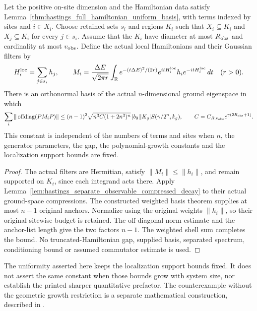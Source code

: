 \begin{lemma}
    \label{thm:hastings_actual_truncated_basis_polynomial_growth}
    \leanok
    Let the positive on-site dimension and the Hamiltonian data satisfy
    Lemma~\ref{thm:hastings_full_hamiltonian_uniform_basis}, with terms
    indexed by sites and $i\in X_i$. Choose retained sets $s_i$ and regions
    $K_i$ such that $X_i\subseteq K_i$ and $X_j\subseteq K_i$ for every
    $j\in s_i$. Assume that the $K_i$ have diameter at most $R_{\rm obs}$
    and cardinality at most $v_{\rm obs}$.
    Define the actual local Hamiltonians and their Gaussian filters by
    \[
      H_i^{\rm loc}=\sum_{j\in s_i}h_j,\qquad
      M_i=\frac{\Delta E}{\sqrt{2\pi r}}
       \int_{\mathbb R} e^{-(t\Delta E)^2/(2r)}
       e^{itH_i^{\rm loc}}h_i e^{-itH_i^{\rm loc}}\,dt
       \quad(r>0).
    \]
    There is an orthonormal basis of the actual $n$-dimensional ground
    eigenspace in which
    \[
      \sum_i\|\operatorname{offdiag}(PM_iP)\|
      \le (n-1)^2\sqrt{n^3 C(1+2n^3)^n}\,
          |b_0||K_g|S(\gamma/2^n,k_g),
      \qquad
      C=C_{R,v_{\rm obs}}e^{\gamma(2R_{\rm obs}+1)}.
    \]
    This constant is independent of the numbers of terms and sites when
    $n$, the generator parameters, the gap, the polynomial-growth constants
    and the localization support bounds are fixed.
\end{lemma}
\begin{proof}\leanok
    The actual filters are Hermitian, satisfy $\|M_i\|\le\|h_i\|$, and
    remain supported on $K_i$, since each integrand acts there.
    Apply Lemma~\ref{lem:hastings_separate_observable_compressed_decay}
    to their actual ground-space compressions. The constructed weighted
    basis theorem supplies at most $n-1$ original anchors.
    Normalize using the original weights $\|h_i\|$, so their original
    sitewise budget is retained. The off-diagonal norm estimate and the
    anchor-list length give the two factors $n-1$. The weighted shell sum
    completes the bound. No truncated-Hamiltonian gap, supplied basis,
    separated spectrum, conditioning bound or assumed commutator estimate
    is used.
\end{proof}

The uniformity asserted here keeps the localization support bounds fixed.
It does not assert the same constant when those bounds grow with system
size, nor establish the printed sharper quantitative prefactor. The counterexample without the geometric growth restriction is a separate
mathematical construction, described in
\cite{gap:hastings05_tree_basis_counterexample}.
